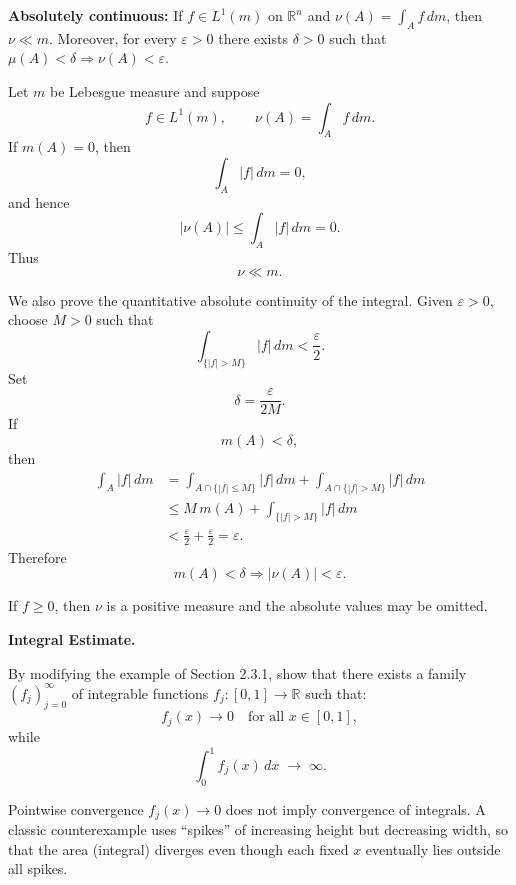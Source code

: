 \begin{problem}[CP-II-0113]
\label{prob:cp-ii-0113}
\textbf{Absolutely continuous:}
		If $f\in L^1(m)$ on $\mathbb R^n$ and $\nu(A)=\int_A f\,dm$, then $\nu\ll m$.
		Moreover, for every $\varepsilon>0$ there exists $\delta>0$ such that
		$\mu(A)<\delta\Rightarrow \nu(A)<\varepsilon$.
\end{problem}

\begin{solution}
Let \(m\) be Lebesgue measure and suppose
\[
f\in L^1(m),
\qquad
\nu(A)=\int_A f\,dm.
\]
If \(m(A)=0\), then
\[
\int_A|f|\,dm=0,
\]
and hence
\[
|\nu(A)|
\le
\int_A|f|\,dm
=
0.
\]
Thus
\[
\boxed{\nu\ll m.}
\]

We also prove the quantitative absolute continuity of the integral. Given
\(\varepsilon>0\), choose \(M>0\) such that
\[
\int_{\{|f|>M\}}|f|\,dm
<
\frac{\varepsilon}{2}.
\]
Set
\[
\delta=\frac{\varepsilon}{2M}.
\]
If
\[
m(A)<\delta,
\]
then
\[
\begin{aligned}
\int_A|f|\,dm
&=
\int_{A\cap\{|f|\le M\}}|f|\,dm
+
\int_{A\cap\{|f|>M\}}|f|\,dm\\
&\le
M\,m(A)
+
\int_{\{|f|>M\}}|f|\,dm\\
&<
\frac{\varepsilon}{2}
+
\frac{\varepsilon}{2}
=
\varepsilon.
\end{aligned}
\]
Therefore
\[
\boxed{
m(A)<\delta
\Longrightarrow
|\nu(A)|<\varepsilon.
}
\]

If \(f\ge0\), then \(\nu\) is a positive measure and the absolute values may be omitted.
\end{solution}


\begin{problem}[CP-II-0115]
\label{prob:cp-ii-0115}
\textbf{Integral Estimate.}

\hspace*{1.5em}By modifying the example of Section 2.3.1, show that there exists a family
$(f_j)_{j=0}^\infty$ of integrable functions $f_j:[0,1]\to\mathbb{R}$ such that:
\[
f_j(x)\to 0 \quad \text{for all } x\in[0,1],
\]
while
\[
\int_0^1 f_j(x)\,dx \;\to\;\infty.
\]

Pointwise convergence $f_j(x)\to 0$ does not imply convergence of integrals.
A classic counterexample uses ``spikes'' of increasing height but decreasing width, so that the area (integral) diverges even though each fixed $x$ eventually lies outside all spikes.
\end{problem}

